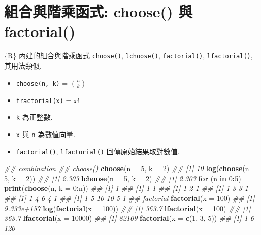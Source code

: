 \documentclass[
]{book}
\newenvironment{Shaded}{\begin{snugshade}}{\end{snugshade}}
\newcommand{\CommentTok}[1]{\textcolor[rgb]{0.56,0.35,0.01}{\textit{#1}}}
\newcommand{\ControlFlowTok}[1]{\textcolor[rgb]{0.13,0.29,0.53}{\textbf{#1}}}
\newcommand{\DataTypeTok}[1]{\textcolor[rgb]{0.13,0.29,0.53}{#1}}
\newcommand{\DecValTok}[1]{\textcolor[rgb]{0.00,0.00,0.81}{#1}}
\newcommand{\KeywordTok}[1]{\textcolor[rgb]{0.13,0.29,0.53}{\textbf{#1}}}
\newcommand{\NormalTok}[1]{#1}
\newcommand{\OperatorTok}[1]{\textcolor[rgb]{0.81,0.36,0.00}{\textbf{#1}}}
\providecommand{\tightlist}{%
  \setlength{\itemsep}{0pt}\setlength{\parskip}{0pt}}
\begin{document}
\hypertarget{ux7d44ux5408ux8207ux968eux4e58ux51fdux5f0f-choose-ux8207-factorial}{%
\section{組合與階乘函式: choose() 與 factorial()}\label{ux7d44ux5408ux8207ux968eux4e58ux51fdux5f0f-choose-ux8207-factorial}}

\{R\} 內建的組合與階乘函式
\texttt{choose()},
\texttt{lchoose()},
\texttt{factorial()},
\texttt{lfactorial()},
其用法類似.

\begin{itemize}
\tightlist
\item
  \texttt{choose(n,\ k)} = \(\binom{n}{k}\)
\item
  \texttt{fractorial(x)} = \(x!\)
\item
  \texttt{k} 為正整數.
\item
  \texttt{x} 與 \texttt{n} 為數值向量.
\item
  \texttt{factorial()}, \texttt{lfactorial()} 回傳原始結果取對數值.
\end{itemize}

\begin{Shaded}
\begin{Highlighting}[]
\CommentTok{\#\# combination}
\CommentTok{\#\# choose()}
\KeywordTok{choose}\NormalTok{(}\DataTypeTok{n =} \DecValTok{5}\NormalTok{, }\DataTypeTok{k =} \DecValTok{2}\NormalTok{)}
\CommentTok{\#\# [1] 10}
\KeywordTok{log}\NormalTok{(}\KeywordTok{choose}\NormalTok{(}\DataTypeTok{n =} \DecValTok{5}\NormalTok{, }\DataTypeTok{k =} \DecValTok{2}\NormalTok{))}
\CommentTok{\#\# [1] 2.303}
\KeywordTok{lchoose}\NormalTok{(}\DataTypeTok{n =} \DecValTok{5}\NormalTok{, }\DataTypeTok{k =} \DecValTok{2}\NormalTok{)}
\CommentTok{\#\# [1] 2.303}
\ControlFlowTok{for}\NormalTok{ (n }\ControlFlowTok{in} \DecValTok{0}\OperatorTok{:}\DecValTok{5}\NormalTok{)}
  \KeywordTok{print}\NormalTok{(}\KeywordTok{choose}\NormalTok{(n, }\DataTypeTok{k =} \DecValTok{0}\OperatorTok{:}\NormalTok{n))}
\CommentTok{\#\# [1] 1}
\CommentTok{\#\# [1] 1 1}
\CommentTok{\#\# [1] 1 2 1}
\CommentTok{\#\# [1] 1 3 3 1}
\CommentTok{\#\# [1] 1 4 6 4 1}
\CommentTok{\#\# [1]  1  5 10 10  5  1}
\CommentTok{\#\# factorial}
\KeywordTok{factorial}\NormalTok{(}\DataTypeTok{x =} \DecValTok{100}\NormalTok{)}
\CommentTok{\#\# [1] 9.333e+157}
\KeywordTok{log}\NormalTok{(}\KeywordTok{factorial}\NormalTok{(}\DataTypeTok{x =} \DecValTok{100}\NormalTok{))}
\CommentTok{\#\# [1] 363.7}
\KeywordTok{lfactorial}\NormalTok{(}\DataTypeTok{x =} \DecValTok{100}\NormalTok{)}
\CommentTok{\#\# [1] 363.7}
\KeywordTok{lfactorial}\NormalTok{(}\DataTypeTok{x =} \DecValTok{10000}\NormalTok{)}
\CommentTok{\#\# [1] 82109}
\KeywordTok{factorial}\NormalTok{(}\DataTypeTok{x =} \KeywordTok{c}\NormalTok{(}\DecValTok{1}\NormalTok{, }\DecValTok{3}\NormalTok{, }\DecValTok{5}\NormalTok{))}
\CommentTok{\#\# [1]   1   6 120}
\end{Highlighting}
\end{Shaded}
\end{document}
